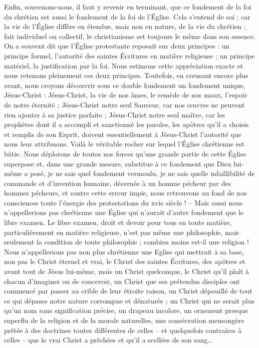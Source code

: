 Enfin, souvenons-nous, il faut y revenir en terminant, que ce fondement de la foi du chrétien est aussi le fondement de la foi de l’Église. Cela s’entend de soi ; car la vie de l’Église diffère en étendue, mais non en nature, de la vie du chrétien ; fait individuel ou collectif, le christianisme est toujours le même dans son essence. On a souvent dit que l’Église protestante reposait sur deux principes : un principe formel, l’autorité des saintes Écritures en matière religieuse ; un principe matériel, la justification par la foi. Nous estimons cette appréciation exacte et nous retenons pleinement ces deux principes. Toutefois, en creusant encore plus avant, nous croyons découvrir sous ce double fondement un fondement unique, Jésus-Christ : Jésus-Christ, la vie de nos âmes, le remède de nos maux, l’espoir de notre éternité ; Jésus-Christ notre seul Sauveur, car nos œuvres ne peuvent rien ajouter à sa justice parfaite ; Jésus-Christ notre seul maître, car les prophètes dont il a accompli et sanctionné les paroles, les apôtres qu’il a choisis et remplis de son Esprit, doivent essentiellement à Jésus-Christ l’autorité que nous leur attribuons. Voilà le véritable rocher sur lequel l’Église chrétienne est bâtie. Nous déplorons de toutes nos forces qu’une grande partie de cette Église superpose et, dans une grande mesure, substitue à ce fondement que Dieu lui-même a posé, je ne sais quel fondement vermoulu, je ne sais quelle infaillibilité de commande et d’invention humaine, décernée à un homme pécheur par des hommes pécheurs, et contre cette erreur impie, nous retrouvons au fond de nos consciences toute l’énergie des protestations du xvie siècle ! – Mais aussi nous n’appellerions pas chrétienne une Église qui n’aurait d’autre fondement que le libre examen. Le libre examen, droit et devoir pour tous en toute matière, particulièrement en matière religieuse, n’est pas même une philosophie, mais seulement la condition de toute philosophie ; combien moins est-il une religion ! Nous n’appellerions pas non plus chrétienne une Eglise qui mettrait à sa base, non pas le Christ éternel et vrai, le Christ des saintes Écritures, des apôtres et avant tout de Jésus lui-même, mais un Christ quelconque, le Christ qu’il plaît à chacun d’imaginer ou de concevoir, un Christ que ses prétendus disciples ont commencé par passer au crible de leur étroite raison, un Christ dépouillé de tout ce qui dépasse notre nature corrompue et dénaturée ; un Christ qui ne serait plus qu’un nom sans signification précise, un drapeau incolore, un ornement presque superflu de la religion et de la morale naturelles, une consécration mensongère prêtée à des doctrines toutes différentes de celles – et quelquefois contraires à celles – que le vrai Christ a prêchées et qu’il a scellées de son sang…

